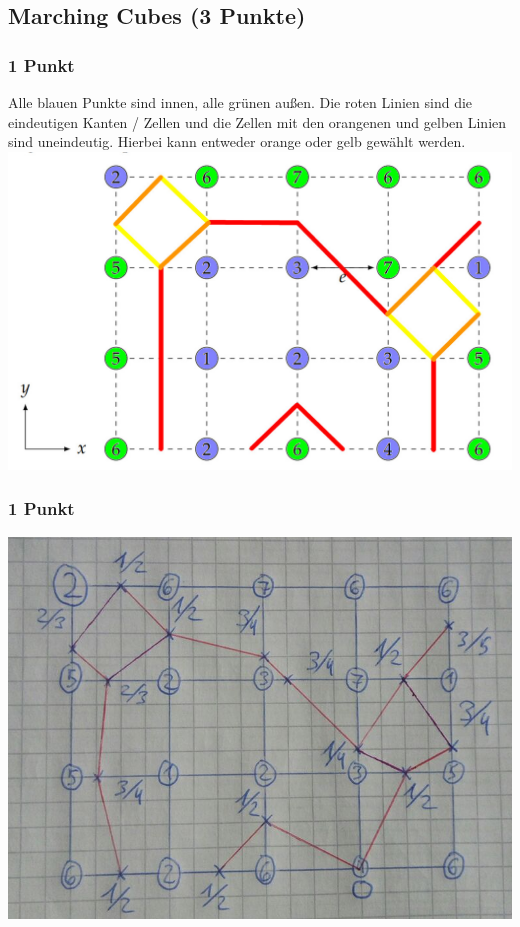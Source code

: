 \newif\ifvimbug
\vimbugfalse

\ifvimbug

\fi


\subsection{Marching Cubes (3 Punkte)}
\subsubsection{1 Punkt}
Alle blauen Punkte sind innen, alle grünen außen. Die roten Linien sind die eindeutigen Kanten / Zellen und die Zellen mit den orangenen und gelben Linien sind uneindeutig. Hierbei kann entweder orange oder gelb gewählt werden. \\
\includegraphics[width=(\textwidth/2)]{51a.jpg} 
\subsubsection{1 Punkt}
\includegraphics[width=(\textwidth/2)]{1b.png} 
